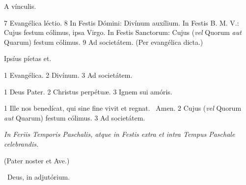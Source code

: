 
 A vínculis.

 7 Evangélica léctio. 8 In Festis Dómini: Divínum auxílium. In Festis B. M. V.: Cujus festum cólimus, ipsa Virgo. In Festis Sanctorum: Cujus (\textit{vel} Quorum \textit{aut} Quarum) festum cólimus. 9 Ad societátem. (Per evangélica dicta.)


 Ipsíus píetas et.


 1 Evangélica. 2 Divínum. 3 Ad societátem.


 1 Deus Pater. 2 Christus perpétuæ. 3 Ignem sui amóris.


 1 Ille nos benedícat, qui sine fine vivit et regnat. \R\ Amen. 2 Cujus (\textit{vel} Quorum \textit{aut} Quarum) festum cólimus. 3 Ad societátem.

\sectionornament



\textit{In Feriis Temporis Paschalis, atque in Festis extra et intra Tempus Paschale celebrandis.}

(Pater noster et Ave.)

\V\ Deus, in adjutórium.

